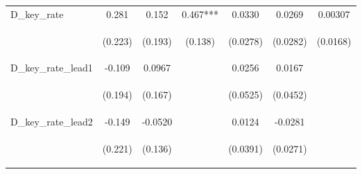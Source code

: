 \documentclass[]{article}
\begin{document}
\begin{center}
\begin{tabular}{lcccccc}
D\_key\_rate & 0.281 & 0.152 & 0.467*** & 0.0330 & 0.0269 & 0.00307 \\
\vspace{4pt} & \begin{footnotesize}(0.223)\end{footnotesize} & \begin{footnotesize}(0.193)\end{footnotesize} & \begin{footnotesize}(0.138)\end{footnotesize} & \begin{footnotesize}(0.0278)\end{footnotesize} & \begin{footnotesize}(0.0282)\end{footnotesize} & \begin{footnotesize}(0.0168)\end{footnotesize} \\
D\_key\_rate\_lead1 & -0.109 & 0.0967 &  & 0.0256 & 0.0167 &  \\
\vspace{4pt} & \begin{footnotesize}(0.194)\end{footnotesize} & \begin{footnotesize}(0.167)\end{footnotesize} & \begin{footnotesize}\end{footnotesize} & \begin{footnotesize}(0.0525)\end{footnotesize} & \begin{footnotesize}(0.0452)\end{footnotesize} & \begin{footnotesize}\end{footnotesize} \\
D\_key\_rate\_lead2 & -0.149 & -0.0520 &  & 0.0124 & -0.0281 &  \\
\vspace{4pt} & \begin{footnotesize}(0.221)\end{footnotesize} & \begin{footnotesize}(0.136)\end{footnotesize} & \begin{footnotesize}\end{footnotesize} & \begin{footnotesize}(0.0391)\end{footnotesize} & \begin{footnotesize}(0.0271)\end{footnotesize} & \begin{footnotesize}\end{footnotesize} \\

\end{tabular}
\end{center}
\end{document}

